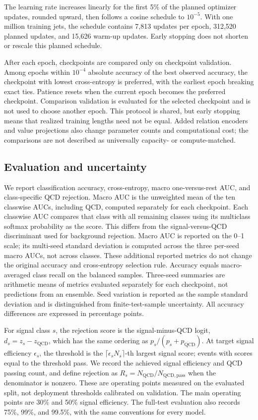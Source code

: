 The learning rate increases linearly for the first 5\% of the planned
optimizer updates, rounded upward, then follows a cosine schedule to
$10^{-5}$. With one million training jets, the schedule contains 7,813
updates per epoch, 312,520 planned updates, and 15,626 warm-up updates.
Early stopping does not shorten or rescale this planned schedule.

After each epoch, checkpoints are compared only on checkpoint validation.
Among epochs within $10^{-4}$ absolute accuracy of the best observed
accuracy, the checkpoint with lowest cross-entropy is preferred, with the
earliest epoch breaking exact ties. Patience resets when the current epoch
becomes the preferred checkpoint. Comparison validation is evaluated for
the selected checkpoint and is not used to choose another epoch. This
protocol is shared, but early stopping means that realized training lengths
need not be equal. Added relation encoders and value projections also
change parameter counts and computational cost; the comparisons are not
described as universally capacity- or compute-matched.

\subsection{Evaluation and uncertainty}
\label{sec:evaluation-protocol}

We report classification accuracy, cross-entropy, macro one-versus-rest
AUC, and class-specific QCD rejection. Macro AUC is the unweighted mean
of the ten classwise AUCs, including QCD, computed separately for each
checkpoint. Each classwise AUC compares that class with all remaining
classes using its multiclass softmax probability as the score. This differs
from the signal-versus-QCD discriminant used for background rejection.
Macro AUC is reported on the 0--1 scale; its multi-seed standard deviation
is computed across the three per-seed macro AUCs, not across classes.
These additional reported metrics do not change the original accuracy and
cross-entropy selection rule. Accuracy equals macro-averaged class recall
on the balanced samples. Three-seed summaries are arithmetic means of
metrics evaluated separately for each checkpoint, not predictions from an
ensemble. Seed variation is reported as the sample standard deviation and
is distinguished from finite-test-sample uncertainty. All accuracy
differences are expressed in percentage points.

For signal class $s$, the rejection score is the signal-minus-QCD logit,
$d_s=z_s-z_{\mathrm{QCD}}$, which has the same ordering as
$p_s/(p_s+p_{\mathrm{QCD}})$. At target signal efficiency $\epsilon_s$,
the threshold is the $\lceil\epsilon_s N_s\rceil$-th largest signal score;
events with scores equal to the threshold pass. We record the achieved
signal efficiency and QCD passing count, and define rejection as
$R_s=N_{\mathrm{QCD}}/N_{\mathrm{QCD,pass}}$ when the denominator is
nonzero. These are operating points measured on the evaluated split, not
deployment thresholds calibrated on validation. The main operating points
are 30\% and 50\% signal efficiency. The full-test evaluation also records
75\%, 99\%, and 99.5\%, with the same conventions for every model.

